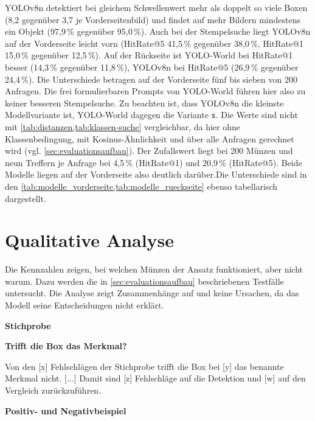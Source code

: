 \noindent YOLOv8n detektiert bei gleichem Schwellenwert mehr als doppelt so viele Boxen (8,2 gegenüber 3,7 je Vorderseitenbild) und findet auf mehr Bildern mindestens ein Objekt (97,9\,\% gegenüber 95,0\,\%). Auch bei der Stempelsuche liegt YOLOv8n auf der Vorderseite leicht vorn (HitRate@5 41,5\,\% gegenüber 38,0\,\%, HitRate@1 15,0\,\% gegenüber 12,5\,\%). Auf der Rückseite ist YOLO-World bei HitRate@1 besser (14,3\,\% gegenüber 11,8\,\%), YOLOv8n bei HitRate@5 (26,9\,\% gegenüber 24,4\,\%). Die Unterschiede betragen auf der Vorderseite fünf bis sieben von 200 Anfragen. Die frei formulierbaren Prompts von YOLO-World führen hier also zu keiner besseren Stempelsuche. Zu beachten ist, dass YOLOv8n die kleinste Modellvariante ist, YOLO-World dagegen die Variante \texttt{s}. Die Werte sind nicht mit \cref{tab:distanzen,tab:klassen-suche} vergleichbar, da hier ohne Klassenbedingung, mit Kosinus-Ähnlichkeit und über alle Anfragen gerechnet wird (vgl. \cref{sec:evaluationsaufbau}). Der Zufallswert liegt bei 200 Münzen und neun Treffern je Anfrage bei 4,5\,\% (HitRate@1) und 20,9\,\% (HitRate@5). Beide Modelle liegen auf der Vorderseite also deutlich darüber.Die Unterschiede sind in den \cref{tab:modelle_vorderseite,tab:modelle_rueckseite} ebenso tabellarisch dargestellt.


\section{Qualitative Analyse}
\label{sec:qualitativeanalyse}
Die Kennzahlen zeigen, bei welchen Münzen der Ansatz funktioniert, aber nicht warum. Dazu werden die in \cref{sec:evaluationsaufbau} beschriebenen Testfälle untersucht. Die Analyse zeigt Zusammenhänge auf und keine Ursachen, da das Modell seine Entscheidungen nicht erklärt. 

\noindent \textbf{Stichprobe}
 
 
\noindent \textbf{Trifft die Box das Merkmal?}
 
\noindent Von den [x] Fehlschlägen der Stichprobe trifft die Box bei [y] das benannte Merkmal nicht. [...] Damit sind [z] Fehlschläge auf die Detektion und [w] auf den Vergleich zurückzuführen.
 
\noindent \textbf{Positiv- und Negativbeispiel}
 

